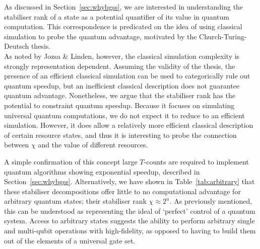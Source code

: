\documentclass{standalone}
\begin{document}
As discussed in Section~\ref{sec:whybgss}, we are interested in understanding the stabiliser rank of a state as a potential quantifier of its value in quantum computation. This correspondence is predicated on the idea of using classical simulation to probe the quantum advantage, motivated by the Church-Turing-Deutsch thesis.\\
As noted by Jozsa \& Linden, however, the classical simulation complexity is strongly representation dependent. Assuming the validity of the thesis, the presence of an efficient classical simulation can be used to categorically rule out quantum speedup, but an inefficient classical description does not guarantee quantum advantage. Nonetheless, we argue that the stabiliser rank has the potential to constraint quantum speedup. Because it focuses on simulating universal quantum computations, we do not expect it to reduce to an efficient simulation. However, it does allow a relatively more efficient classical description of certain resource states, and thus it is interesting to probe the connection between $\chi$ and the value of different resources. 
\par
A simple confirmation of this concept large $T$-counts are required to implement quantum algorithms showing exponential speedup, described in Section~\ref{sec:whybgss}. Alternatively, we have shown in Table~\ref{tab:arbitrary} that these stabiliser decompositions offer little to no computational advantage for arbitrary quantum states; their stabiliser rank $\chi\approx2^{n}$. As previously mentioned, this can be understood as representing the ideal of `perfect' control of a quantum system. Access to arbitrary states suggests the ability to perform arbitrary single and multi-qubit operations with high-fidelity, as opposed to having to build them out of the elements of a universal gate set.\\
\end{document}
